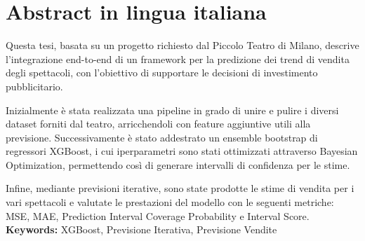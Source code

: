 \documentclass{Configuration_Files/PoliMi3i_thesis}
\begin{document}
\chapter*{Abstract in lingua italiana}
Questa tesi, basata su un progetto richiesto dal Piccolo Teatro di Milano, descrive l’integrazione end-to-end di un framework per la predizione dei trend di vendita degli spettacoli, con l’obiettivo di supportare le decisioni di investimento pubblicitario.

Inizialmente è stata realizzata una pipeline in grado di unire e pulire i diversi dataset forniti dal teatro, arricchendoli con feature aggiuntive utili alla previsione. Successivamente è stato addestrato un ensemble bootstrap di regressori XGBoost, i cui iperparametri sono stati ottimizzati attraverso Bayesian Optimization, permettendo così di generare intervalli di confidenza per le stime.

Infine, mediante previsioni iterative, sono state prodotte le stime di vendita per i vari spettacoli e valutate le prestazioni del modello con le seguenti metriche: MSE, MAE, Prediction Interval Coverage Probability e Interval Score.\\
\textbf{Keywords:} XGBoost, Previsione Iterativa, Previsione Vendite %


\thispagestyle{empty}
\tableofcontents %
\thispagestyle{empty}
\cleardoublepage

%
%
%    
%
\end{document}
